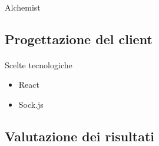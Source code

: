       \begin{frame}{\insertsectionhead}
        \framesubtitle{\insertsubsectionhead}

        \begin{block}{Alchemist}
        \end{block}
      \end{frame}

    \subsection{Progettazione del client}

      \begin{frame}{\insertsectionhead}
        \framesubtitle{\insertsubsectionhead}
        \begin{block}{Scelte tecnologiche}
          \begin{itemize}
            \item React   %
            \item Sock.js %
          \end{itemize}
        \end{block}
      \end{frame}

    \subsection{Valutazione dei risultati}

